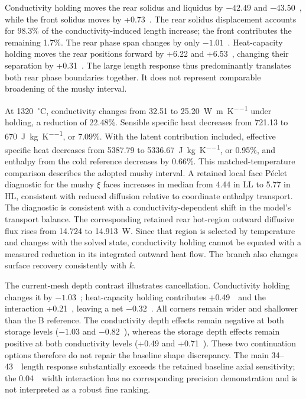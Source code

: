 Conductivity holding moves the rear solidus and liquidus by $-42.49$ and $-43.50$~\um, while the front solidus moves by +0.73~\um. The rear solidus displacement accounts for 98.3\% of the conductivity-induced length increase; the front contributes the remaining 1.7\%. The rear phase span changes by only $-1.01$~\um. Heat-capacity holding moves the rear positions forward by +6.22 and +6.53~\um, changing their separation by +0.31~\um. The large length response thus predominantly translates both rear phase boundaries together. It does not represent comparable broadening of the mushy interval.

At 1320~$^\circ$C, conductivity changes from 32.51 to 25.20~\si{\watt\per\metre\per\kelvin} under holding, a reduction of 22.48\%. Sensible specific heat decreases from 721.13 to 670~\si{\joule\per\kilogram\per\kelvin}, or 7.09\%. With the latent contribution included, effective specific heat decreases from 5387.79 to 5336.67~\si{\joule\per\kilogram\per\kelvin}, or 0.95\%, and enthalpy from the cold reference decreases by 0.66\%. This matched-temperature comparison describes the adopted mushy interval. A retained local face P\'eclet diagnostic for the mushy $\xi$ faces increases in median from 4.44 in LL to 5.77 in HL, consistent with reduced diffusion relative to coordinate enthalpy transport. The diagnostic is consistent with a conductivity-dependent shift in the model's transport balance. The corresponding retained rear hot-region outward diffusive flux rises from 14.724 to 14.913~W. Since that region is selected by temperature and changes with the solved state, conductivity holding cannot be equated with a measured reduction in its integrated outward heat flow. The branch also changes surface recovery consistently with $k$.

The current-mesh depth contrast illustrates cancellation. Conductivity holding changes it by $-1.03$~\um; heat-capacity holding contributes +0.49~\um\ and the interaction +0.21~\um, leaving a net $-0.32$~\um. All corners remain wider and shallower than the B reference. The conductivity depth effects remain negative at both storage levels ($-1.03$ and $-0.82$~\um), whereas the storage depth effects remain positive at both conductivity levels (+0.49 and +0.71~\um). These two continuation options therefore do not repair the baseline shape discrepancy. The main 34--43~\um\ length response substantially exceeds the retained baseline axial sensitivity; the 0.04~\um\ width interaction has no corresponding precision demonstration and is not interpreted as a robust fine ranking.

